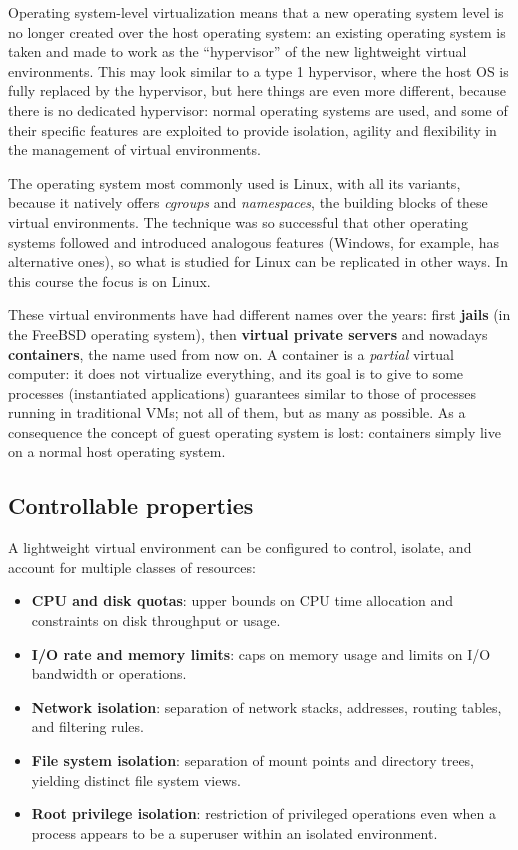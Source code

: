 Operating system-level virtualization means that a new operating system level is no longer created over the host operating system: an existing operating system is taken and made to work as the ``hypervisor'' of the new lightweight virtual environments. This may look similar to a type 1 hypervisor, where the host OS is fully replaced by the hypervisor, but here things are even more different, because there is no dedicated hypervisor: normal operating systems are used, and some of their specific features are exploited to provide isolation, agility and flexibility in the management of virtual environments.

The operating system most commonly used is Linux, with all its variants, because it natively offers \emph{cgroups} and \emph{namespaces}, the building blocks of these virtual environments. The technique was so successful that other operating systems followed and introduced analogous features (Windows, for example, has alternative ones), so what is studied for Linux can be replicated in other ways. In this course the focus is on Linux.

These virtual environments have had different names over the years: first \textbf{jails} (in the FreeBSD operating system), then \textbf{virtual private servers} and nowadays \textbf{containers}, the name used from now on. A container is a \emph{partial} virtual computer: it does not virtualize everything, and its goal is to give to some processes (instantiated applications) guarantees similar to those of processes running in traditional VMs; not all of them, but as many as possible. As a consequence the concept of guest operating system is lost: containers simply live on a normal host operating system.

\subsection{Controllable properties}

A lightweight virtual environment can be configured to control, isolate, and account for multiple classes of resources:

\begin{itemize}
\item \textbf{CPU and disk quotas}: upper bounds on CPU time allocation and constraints on disk throughput or usage.
\item \textbf{I/O rate and memory limits}: caps on memory usage and limits on I/O bandwidth or operations.
\item \textbf{Network isolation}: separation of network stacks, addresses, routing tables, and filtering rules.
\item \textbf{File system isolation}: separation of mount points and directory trees, yielding distinct file system views.
\item \textbf{Root privilege isolation}: restriction of privileged operations even when a process appears to be a superuser within an isolated environment.
\end{itemize}

